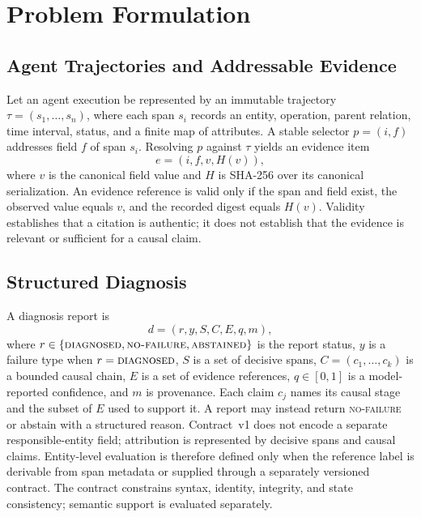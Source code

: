 \section{Problem Formulation}
\label{sec:problem}

\subsection{Agent Trajectories and Addressable Evidence}

Let an agent execution be represented by an immutable trajectory
$\tau=(s_1,\ldots,s_n)$, where each span $s_i$ records an entity, operation,
parent relation, time interval, status, and a finite map of attributes. A
stable selector $p=(i,f)$ addresses field $f$ of span $s_i$. Resolving $p$
against $\tau$ yields an evidence item
\begin{equation}
    e=(i,f,v,H(v)),
\end{equation}
where $v$ is the canonical field value and $H$ is SHA-256 over its canonical
serialization. An evidence reference is valid only if the span and field
exist, the observed value equals $v$, and the recorded digest equals $H(v)$.
Validity establishes that a citation is authentic; it does not establish that
the evidence is relevant or sufficient for a causal claim.

\subsection{Structured Diagnosis}

A diagnosis report is
\begin{equation}
    d=(r,y,S,C,E,q,m),
\end{equation}
where $r\in\{\textsc{diagnosed},\textsc{no-failure},\textsc{abstained}\}$ is
the report status, $y$ is a failure type when $r=\textsc{diagnosed}$, $S$ is a set of
decisive spans, $C=(c_1,\ldots,c_k)$ is a bounded causal chain, $E$ is a set of
evidence references, $q\in[0,1]$ is a model-reported confidence, and $m$ is
provenance. Each claim $c_j$ names its causal stage and the subset of $E$ used
to support it. A report may instead return \textsc{no-failure} or abstain with
a structured reason. Contract~v1 does not encode a separate
responsible-entity field; attribution is represented by decisive spans and
causal claims. Entity-level evaluation is therefore defined only when the
reference label is derivable from span metadata or supplied through a separately
versioned contract. The contract constrains
syntax, identity, integrity, and state consistency; semantic support is
evaluated separately.

